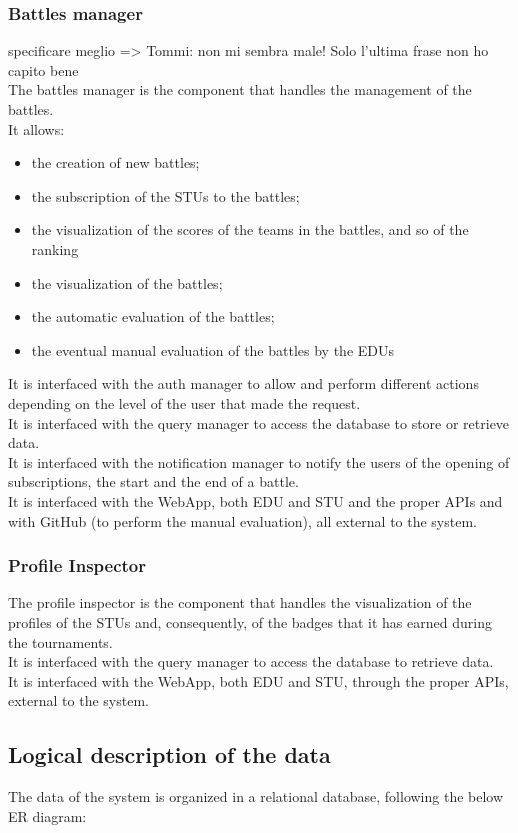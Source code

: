\subsubsection*{Battles manager}
{\color{red} specificare meglio => Tommi: non mi sembra male! Solo l'ultima frase non ho capito bene \\}
The battles manager is the component that handles the management of the battles.\\
It allows:
\begin{itemize}
    \item the creation of new battles;
    \item the subscription of the STUs to the battles;
    \item the visualization of the scores of the teams in the battles, and so of the ranking
    \item the visualization of the battles;
    \item the automatic evaluation of the battles;
    \item the eventual manual evaluation of the battles by the EDUs
\end{itemize}
It is interfaced with the auth manager to allow and perform different actions depending on the level of the user that made the request. \\
It is interfaced with the query manager to access the database to store or retrieve data. \\
It is interfaced with the notification manager to notify the users of the opening of subscriptions, the start and the end of a battle.\\
It is interfaced with the WebApp, both EDU and STU and the proper APIs and with GitHub (to perform the manual evaluation), all external to the system.

\subsubsection*{Profile Inspector}
The profile inspector is the component that handles the visualization of the profiles of the STUs and, consequently, of the badges that it has earned during the tournaments. \\
It is interfaced with the query manager to access the database to retrieve data. \\
It is interfaced with the WebApp, both EDU and STU, through the proper APIs, external to the system.

\subsection{Logical description of the data}
The data of the system is organized in a relational database, following the below ER diagram:

